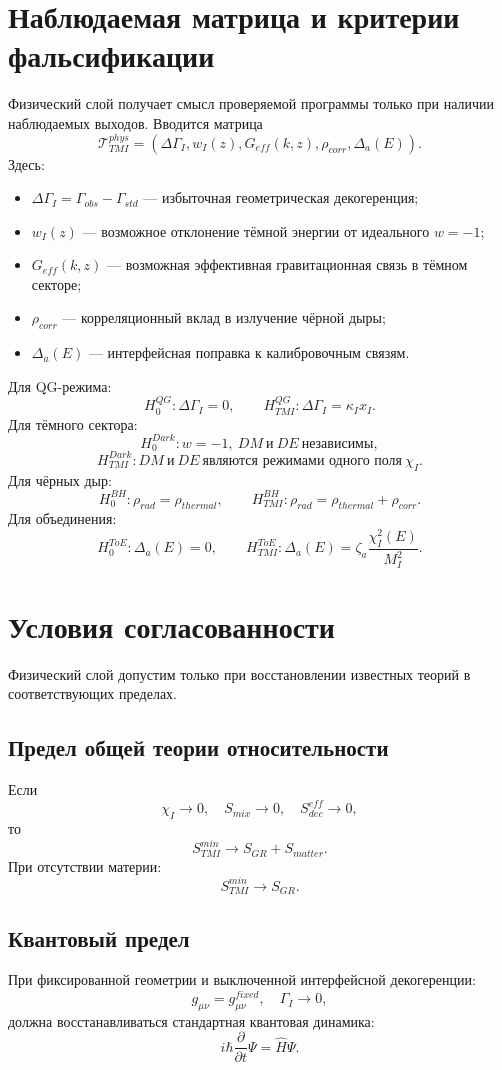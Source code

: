 \documentclass[12pt,a4paper]{article}
\begin{document}
\section{Наблюдаемая матрица и критерии фальсификации}
Физический слой получает смысл проверяемой программы только при наличии наблюдаемых выходов. Вводится матрица
\[
\boxed{
\mathcal T_{TMI}^{phys}=\left(\Delta\Gamma_I,
 w_I(z),G_{eff}(k,z),\rho_{corr},\Delta_a(E)\right).
}
\]
Здесь:
\begin{itemize}[leftmargin=2em]
\item $\Delta\Gamma_I=\Gamma_{obs}-\Gamma_{std}$ — избыточная геометрическая декогеренция;
\item $w_I(z)$ — возможное отклонение тёмной энергии от идеального $w=-1$;
\item $G_{eff}(k,z)$ — возможная эффективная гравитационная связь в тёмном секторе;
\item $\rho_{corr}$ — корреляционный вклад в излучение чёрной дыры;
\item $\Delta_a(E)$ — интерфейсная поправка к калибровочным связям.
\end{itemize}

Для QG-режима:
\[
\boxed{H_0^{QG}:\Delta\Gamma_I=0,}
\qquad
\boxed{H_{TMI}^{QG}:\Delta\Gamma_I=\kappa_Ix_I.}
\]
Для тёмного сектора:
\[
\boxed{H_0^{Dark}:w=-1,\ DM\ \text{и}\ DE\ \text{независимы},}
\]
\[
\boxed{H_{TMI}^{Dark}:DM\ \text{и}\ DE\ \text{являются режимами одного поля}\ \chi_I.}
\]
Для чёрных дыр:
\[
\boxed{H_0^{BH}:\rho_{rad}=\rho_{thermal},}
\qquad
\boxed{H_{TMI}^{BH}:\rho_{rad}=\rho_{thermal}+\rho_{corr}.}
\]
Для объединения:
\[
\boxed{H_0^{ToE}:\Delta_a(E)=0,}
\qquad
\boxed{H_{TMI}^{ToE}:\Delta_a(E)=\zeta_a\frac{\chi_I^2(E)}{M_I^2}.}
\]

\section{Условия согласованности}
Физический слой допустим только при восстановлении известных теорий в соответствующих пределах.

\subsection{Предел общей теории относительности}
Если
\[
\boxed{\chi_I\to0,
\quad S_{mix}\to0,
\quad S_{dec}^{eff}\to0,}
\]
то
\[
\boxed{S_{TMI}^{min}\to S_{GR}+S_{matter}.}
\]
При отсутствии материи:
\[
\boxed{S_{TMI}^{min}\to S_{GR}.}
\]

\subsection{Квантовый предел}
При фиксированной геометрии и выключенной интерфейсной декогеренции:
\[
\boxed{g_{\mu\nu}=g_{\mu\nu}^{fixed},\quad\Gamma_I\to0,}
\]
должна восстанавливаться стандартная квантовая динамика:
\[
\boxed{i\hbar\frac{\partial}{\partial t}\Psi=\widehat H\Psi.}
\]
\end{document}
